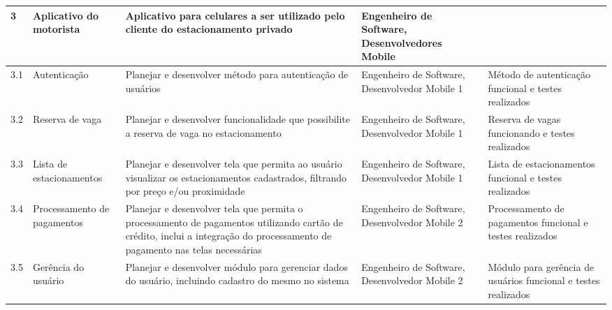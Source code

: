 \begin{landscape}
\begin{longtable}{@{\extracolsep{\fill}}  l  p{}  p{}  p{}  p{}  }
	\midrule
	3           & Aplicativo do motorista                                   & Aplicativo para celulares a ser utilizado pelo cliente do estacionamento privado                                                                                                 & Engenheiro de Software, Desenvolvedores Mobile                                                   &                                                                                                          \\*
	\midrule
	3.1         & Autenticação                                            & Planejar e desenvolver método para autenticação de usuários                                                                                                                  & Engenheiro de Software, Desenvolvedor Mobile 1                                                   & Método de autenticação funcional e testes realizados                                                  \\*
	\midrule
	3.2         & Reserva de vaga                                           & Planejar e desenvolver funcionalidade que possibilite a reserva de vaga no estacionamento                                                                                        & Engenheiro de Software, Desenvolvedor Mobile 1                                                   & Reserva de vagas funcionando e testes realizados                                                         \\*
	\midrule
	3.3         & Lista de estacionamentos                                  & Planejar e desenvolver tela que permita ao usuário visualizar os estacionamentos cadastrados, filtrando por preço e/ou proximidade                                             & Engenheiro de Software, Desenvolvedor Mobile 1                                                   & Lista de estacionamentos funcional e testes realizados                                                   \\*
	\midrule
	3.4         & Processamento de pagamentos                               & Planejar e desenvolver tela que permita o processamento de pagamentos utilizando cartão de crédito, inclui a integração do processamento de pagamento nas telas necessárias & Engenheiro de Software, Desenvolvedor Mobile 2                                                   & Processamento de pagamentos funcional e testes realizados                                                \\*
	\midrule
	3.5         & Gerência do usuário                                     & Planejar e desenvolver módulo para gerenciar dados do usuário, incluindo cadastro do mesmo no sistema                                                                          & Engenheiro de Software, Desenvolvedor Mobile 2                                                   & Módulo para gerência de usuários funcional e testes realizados                                        \\*

\end{longtable}
\end{landscape}

